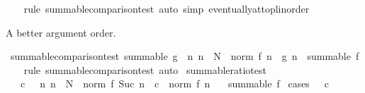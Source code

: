 \begin{isabellebody}
%
\isadelimproof
\ \ %
\endisadelimproof
%
\isatagproof
{}\isamarkupfalse%
\ {\isacharparenleft}{\kern0pt}rule\ summable{\isacharunderscore}{\kern0pt}comparison{\isacharunderscore}{\kern0pt}test{\isacharparenright}{\kern0pt}\ {\isacharparenleft}{\kern0pt}auto\ simp{\isacharcolon}{\kern0pt}\ eventually{\isacharunderscore}{\kern0pt}at{\isacharunderscore}{\kern0pt}top{\isacharunderscore}{\kern0pt}linorder{\isacharparenright}{\kern0pt}%
\endisatagproof
{\isafoldproof}%
%
\isadelimproof
%
\endisadelimproof
%
\begin{isamarkuptext}%
A better argument order.%
\end{isamarkuptext}\isamarkuptrue%
\isamarkupfalse%
\ summable{\isacharunderscore}{\kern0pt}comparison{\isacharunderscore}{\kern0pt}test{\isacharprime}{\kern0pt}{\isacharcolon}{\kern0pt}\ {\isachardoublequoteopen}summable\ g\ {\isasymLongrightarrow}\ {\isacharparenleft}{\kern0pt}{\isasymAnd}n{\isachardot}{\kern0pt}\ n\ {\isasymge}\ N\ {\isasymLongrightarrow}\ norm\ {\isacharparenleft}{\kern0pt}f\ n{\isacharparenright}{\kern0pt}\ {\isasymle}\ g\ n{\isacharparenright}{\kern0pt}\ {\isasymLongrightarrow}\ summable\ f{\isachardoublequoteclose}\isanewline
%
\isadelimproof
\ \ %
\endisadelimproof
%
\isatagproof
{}\isamarkupfalse%
\ {\isacharparenleft}{\kern0pt}rule\ summable{\isacharunderscore}{\kern0pt}comparison{\isacharunderscore}{\kern0pt}test{\isacharparenright}{\kern0pt}\ auto%
\endisatagproof
{\isafoldproof}%
%
\isadelimproof
%
\endisadelimproof
%
\isadelimdocument
%
\endisadelimdocument
%
\isatagdocument
%
\isamarkuptrue%
%
\endisatagdocument
{\isafolddocument}%
%
\isadelimdocument
%
\endisadelimdocument
{}\isamarkupfalse%
\ summable{\isacharunderscore}{\kern0pt}ratio{\isacharunderscore}{\kern0pt}test{\isacharcolon}{\kern0pt}\isanewline
\ \ \ {\isachardoublequoteopen}c\ {\isacharless}{\kern0pt}\ {}{\isachardoublequoteclose}\ {\isachardoublequoteopen}{\isasymAnd}n{\isachardot}{\kern0pt}\ n\ {\isasymge}\ N\ {\isasymLongrightarrow}\ norm\ {\isacharparenleft}{\kern0pt}f\ {\isacharparenleft}{\kern0pt}Suc\ n{\isacharparenright}{\kern0pt}{\isacharparenright}{\kern0pt}\ {\isasymle}\ c\ {\isacharasterisk}{\kern0pt}\ norm\ {\isacharparenleft}{\kern0pt}f\ n{\isacharparenright}{\kern0pt}{\isachardoublequoteclose}\isanewline
\ \ \ {\isachardoublequoteopen}summable\ f{\isachardoublequoteclose}\isanewline
%
\isadelimproof
%
\endisadelimproof
%
\isatagproof
{}\isamarkupfalse%
\ {\isacharparenleft}{\kern0pt}cases\ {\isachardoublequoteopen}{}\ {\isacharless}{\kern0pt}\ c{\isachardoublequoteclose}{\isacharparenright}{\kern0pt}\isanewline

\end{isabellebody}
